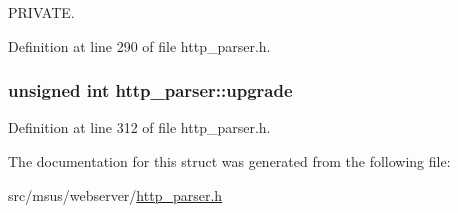 P\-R\-I\-V\-A\-T\-E. 



Definition at line 290 of file http\-\_\-parser.\-h.

\hypertarget{structhttp__parser_a748f476eacc5ac56b84dd07dbafb42a4}{
\subsubsection[{upgrade}]{\setlength{\rightskip}{0pt plus 5cm}unsigned int http\-\_\-parser\-::upgrade}}\label{structhttp__parser_a748f476eacc5ac56b84dd07dbafb42a4}


Definition at line 312 of file http\-\_\-parser.\-h.



The documentation for this struct was generated from the following file\-:\begin{DoxyCompactItemize}
\item 
src/msus/webserver/\hyperlink{http__parser_8h}{http\-\_\-parser.\-h}\end{DoxyCompactItemize}
